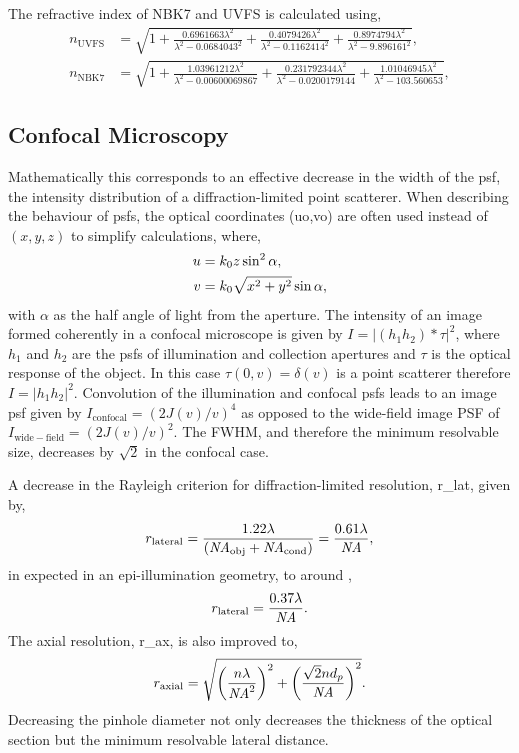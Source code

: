 \documentclass{article}
\begin{document}
The refractive index of NBK7 and UVFS is calculated using,
\begin{align}
n_{\mathrm{UVFS}} &= \sqrt{1 + \frac{0.6961663\lambda^2}{\lambda^2-0.0684043^2} + \frac{0.4079426\lambda^2}{\lambda^2-0.1162414^2} + \frac{0.8974794\lambda^2}{\lambda^2-9.896161^2}}, \\
n_{\mathrm{NBK7}} &= \sqrt{1 + \frac{1.03961212\lambda^2}{\lambda^2-0.00600069867} + \frac{0.231792344\lambda^2}{\lambda^2-0.0200179144} + \frac{1.01046945\lambda^2}{\lambda^2-103.560653}},
\end{align}

\subsection{Confocal Microscopy}

Mathematically this corresponds to an effective decrease in the width of the \gls{psf}, the intensity distribution of a diffraction-limited point scatterer.
When describing the behaviour of \glspl{psf}, the optical coordinates (\gls{uo},\gls{vo}) are often used instead of $(x,y,z)$ to simplify calculations, where,
\begin{subequations}
\begin{align}
u &= k_0 z\sin^2\alpha, \\
v &= k_0 \sqrt{x^2+y^2}\sin\alpha,
\end{align}
\end{subequations}
with $\alpha$ as the half angle of light from the aperture. The intensity of an image formed coherently in a confocal microscope is given by $I=|(h_1h_2) \ast \tau|^2$, where $h_1$ and $h_2$ are the \glspl{psf} of illumination and collection apertures and $\tau$ is the optical response of the object. In this case $\tau(0,v)=\delta(v)$ is a point scatterer therefore $I=|h_1h_2|^2$. Convolution of the illumination and confocal \glspl{psf} leads to an image \gls{psf} given by $I_{\mathrm{confocal}} = \left({2J(v)}/{v}\right)^4$ as opposed to the wide-field image PSF of $I_{\mathrm{wide-field}} = \left({2J(v)}/{v}\right)^2$. The FWHM, and therefore the minimum resolvable size, decreases by $\sqrt{2}$ in the confocal case.

A decrease in the Rayleigh criterion \cite{born1999principles} for diffraction-limited resolution, \gls{r_lat}, given by,
\begin{equation}
	r_{\mathrm{lateral}}=\frac{1.22\lambda}{(\mathit{NA}_{\mathrm{obj}}+\mathit{NA}_{\mathrm{cond}})}=\frac{0.61\lambda}{\mathit{NA}},
\end{equation}
in expected in an epi-illumination geometry, to around \cite{},
\begin{equation}
	r_{\mathrm{lateral}}=\frac{0.37\lambda}{\mathit{NA}}.
\end{equation}
The axial resolution, \gls{r_ax}, is also improved to,
\begin{equation}
	r_{\mathrm{axial}} = \sqrt{\left(\frac{n\lambda}{\mathit{NA}^2}\right)^2 + \left(\frac{\sqrt{2}nd_{p}}{\mathit{NA}}\right)^2}.
\end{equation}
Decreasing the pinhole diameter not only decreases the thickness of the optical section but the minimum resolvable lateral distance.
\end{document}
